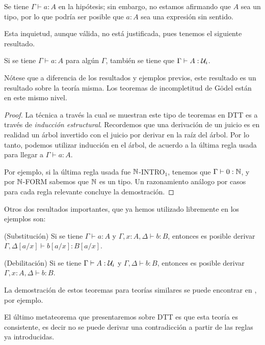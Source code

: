 \documentclass[../main.tex]{subfiles}
\begin{document}
Se tiene $\Gamma \vdash a:A$ en la hipótesis; sin embargo, no estamos afirmando que $A$ sea un tipo, por lo que podr\'ia ser posible que $a:A$ sea una expresión sin sentido.

Esta inquietud, aunque v\'alida, no est\'a justificada, pues tenemos el siguiente resultado.

\begin{theorem}
    Si se tiene {$\Gamma \vdash a:A$} para alg\'un $\Gamma$, también se tiene que $\Gamma \vdash A:\mathcal{U}_i$.
\end{theorem}

N\'otese que a diferencia de los resultados y ejemplos previos, este resultado es un resultado sobre la teoría misma.
Los teoremas de incompletitud de G\"odel \cite{godel_uber_1931} est\'an en este mismo nivel.

\begin{proof}
    La t\'ecnica a través la cual se muestran este tipo de teoremas en DTT es a través de \textit{inducción estructural}.
    Recordemos que una derivaci\'on de un juicio es en realidad un \'arbol invertido con el juicio por derivar en la ra\'iz del \'arbol.
    Por lo tanto, podemos utilizar inducción en el \'arbol, de acuerdo a la \'ultima regla usada para llegar a $\Gamma \vdash a:A$.

    Por ejemplo, si la \'ultima regla usada fue $\mathbb{N}$-INTRO$_1$, tenemos que $\Gamma \vdash 0:\mathbb{N}$, y por $\mathbb{N}$-FORM sabemos que $\mathbb{N}$ es un tipo.
    Un razonamiento an\'alogo por casos para cada regla relevante concluye la demostraci\'on.
\end{proof}

Otros dos resultados importantes, que ya hemos utilizado libremente en los ejemplos son:

\begin{theorem}(Substituci\'on)
    Si se tiene $\Gamma \vdash a : A$ y $\Gamma , x:A , \Delta \vdash b :B$, entonces es posible derivar $\Gamma, \Delta [a/x] \vdash b[a/x] : B[a/x]$.
\end{theorem}
\begin{theorem}(Debilitaci\'on)
    Si se tiene $\Gamma \vdash A : \mathcal{U}_i$ y $\Gamma , \Delta \vdash b :B$, entonces es posible derivar $\Gamma, x:A, \Delta \vdash b:B$.
\end{theorem}

La demostración de estos teoremas  para teor\'ias similares se puede encontrar en \cite{pierce_types_2002}, por ejemplo.

El \'ultimo metateorema que presentaremos sobre DTT es que esta teor\'ia es consistente, es decir no se puede derivar una contradicción a partir de las reglas ya introducidas.
\end{document}
